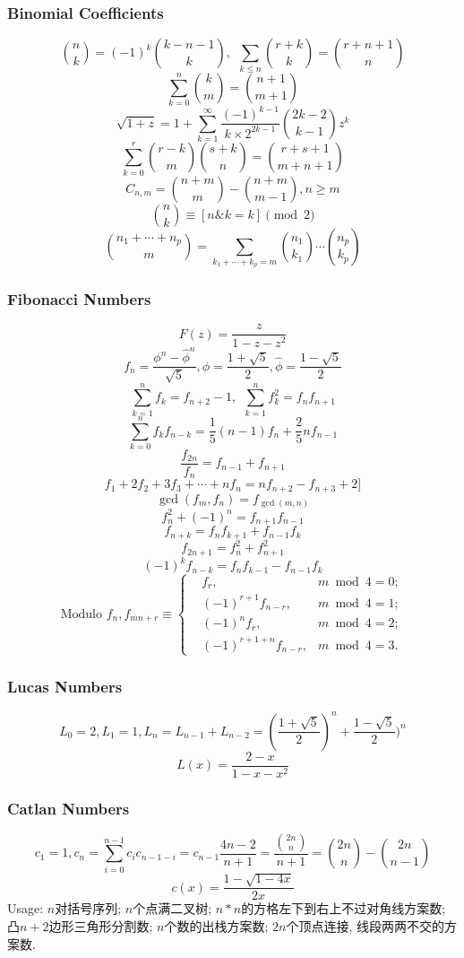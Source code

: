 \begin{small}
\subsubsection{Binomial Coefficients}
\[ {n \choose k} = (-1)^k{k-n-1 \choose k},\ \ \sum_{k \leq n}{r+k \choose k} = {r+n+1 \choose n} \]
\[ \sum_{k=0}^n{k \choose m} = {n+1 \choose m+1} \]
\[ \sqrt{1+z} = 1 + \sum_{k=1}^{\infty}\frac{(-1)^{k-1}}{k\times2^{2k-1}}{2k-2 \choose k-1}z^k \]
\[ \sum_{k=0}^{r}{r-k \choose m}{s+k \choose n} = {r+s+1 \choose m+n+1} \]
\[ C_{n, m} = {n+m \choose m} - {n+m \choose m-1}, n \geq m \]
\[ {n \choose k} \equiv [n\& k=k] \pmod 2 \]
\[ {{n_1+\cdots+n_p}\choose m}=\sum_{k_1+\cdots+k_p=m}{n_1\choose k_1}\cdots{n_p\choose k_p}\]
\subsubsection{Fibonacci Numbers}
\[ F(z) = \frac{z}{1-z-z^2} \]
\[ f_n = \frac{{\phi}^n-{\hat{\phi}}^n}{\sqrt{5}}, \phi = \frac{1+\sqrt{5}}{2},
\hat{\phi} = \frac{1-\sqrt{5}}{2} \]
\[ \sum_{k=1}^nf_k = f_{n+2}-1,\ \ \sum_{k=1}^nf^2_k = f_nf_{n+1} \]
\[ \sum_{k=0}^nf_kf_{n-k} = \frac{1}{5}(n-1)f_n+\frac{2}{5}nf_{n-1} \]
\[ \frac{f_{2n}}{f_n} = f_{n-1} + f_{n+1}\]
\[ f_1+2f_2+3f_3+\cdots+nf_n=nf_{n+2}-f_{n+3}+2]\]
\[ \gcd(f_m,f_n)=f_{\gcd(m,n)}\]
\[ f^2_n + (-1)^n = f_{n+1}f_{n-1} \]
\[ f_{n+k} = f_nf_{k+1} + f_{n-1}f_k \]
\[ f_{2n+1} = f^2_n+f^2_{n+1} \]
\[ (-1)^kf_{n-k} = f_{n}f_{k-1} - f_{n-1}f_{k} \]
\[ \text{Modulo }f_n, f_{mn+r} \equiv \left\{
\begin{aligned}
&f_r,& m \bmod 4 = 0; \\
&(-1)^{r+1}f_{n-r},& m \bmod 4 = 1; \\
&(-1)^nf_r,& m \bmod 4 = 2; \\
&(-1)^{r+1+n}f_{n-r},& m \bmod 4 = 3.
\end{aligned}
\right.
\]
\subsubsection{Lucas Numbers}
\[ L_0=2,L_1=1,L_n=L_{n-1}+L_{n-2}=(\frac{1+\sqrt{5}}{2})^n+\frac{1-\sqrt{5}}{2})^n \]
\[ L(x)=\frac{2-x}{1-x-x^2} \]
\subsubsection{Catlan Numbers}
\[c_1=1,c_n=\sum_{i=0}^{n-1}c_ic_{n-1-i}=c_{n-1}\frac{4n-2}{n+1}=\frac{\binom{2n}{n}}{n+1}=\binom{2n}{n}-\binom{2n}{n-1}\]
\[ c(x)=\frac{1-\sqrt{1-4x}}{2x}\]
Usage: $n$对括号序列; $n$个点满二叉树; $n*n$的方格左下到右上不过对角线方案数; 凸$n+2$边形三角形分割数; $n$个数的出栈方案数; $2n$个顶点连接, 线段两两不交的方案数.

\end{small}
